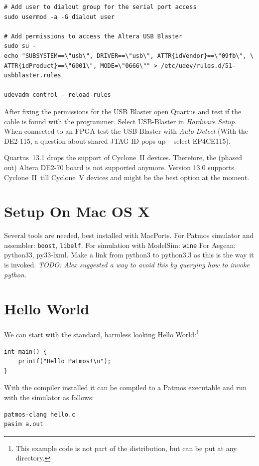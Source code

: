\documentclass[a4paper,fontsize=10pt,twoside,DIV15,BCOR12mm,headinclude=true,footinclude=false,pagesize,bibtotoc]{scrbook}
\newcommand{\code}[1]{{\texttt{#1}}}
\newcommand{\todo}[1]{{\emph{TODO: #1}}}
\begin{document}
\begin{verbatim}
# Add user to dialout group for the serial port access
sudo usermod -a -G dialout user

# Add permissions to access the Altera USB Blaster
sudo su -
echo "SUBSYSTEM==\"usb\", DRIVER==\"usb\", ATTR{idVendor}==\"09fb\", \
ATTR{idProduct}==\"6001\", MODE=\"0666\"" > /etc/udev/rules.d/51-usbblaster.rules

udevadm control --reload-rules
\end{verbatim}

After fixing the permissions for the USB Blaster open Quartus and test if the
cable is found with the programmer. Select USB-Blaster in \emph{Hardware Setup}.
When connected to an FPGA test the USB-Blaster with \emph{Auto Detect}
(With the DE2-115, a question about shared JTAG ID pops up -- select EP4CE115).

Quartus~13.1 drops the support of Cyclone~II devices. Therefore, the
(phased out) Altera DE2-70 board is not supported anymore. Version 13.0 supports Cyclone~II\
till Cyclone~V devices and might be the best option at the moment.

\section{Setup On Mac OS X}

Several tools are needed, best installed with MacPorts. For Patmos simulator and assembler:
\code{boost}, \code{libelf}.
For simulation with ModelSim: \code{wine}
For Aegean: python33, py33-lxml. Make a link from python3 to python3.3 as this is the way it is invoked.
\todo{Alex suggested a way to avoid this by querying how to invoke python.}

\section{Hello World}

We can start with the standard, harmless looking Hello
World:\footnote{This example code is not part of the distribution, but
can be put at any directory.}
\begin{lstlisting}
int main() {
    printf("Hello Patmos!\n");
}
\end{lstlisting}

With the compiler installed it can be compiled to a Patmos executable
and run with the simulator as follows:

\begin{verbatim}
patmos-clang hello.c
pasim a.out
\end{verbatim}
\end{document}
